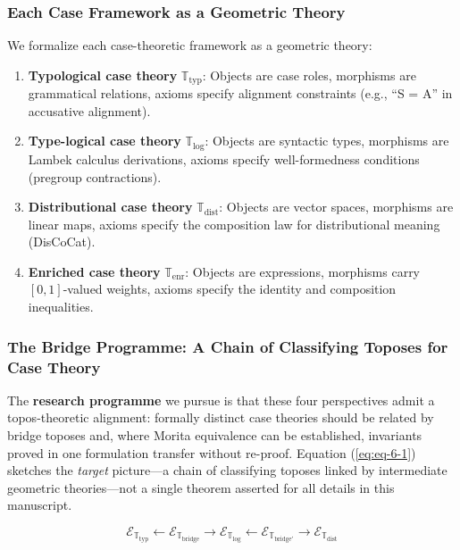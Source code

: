 \documentclass[
]{article}
\begin{document}
\subsubsection{Each Case Framework as a Geometric
Theory}\label{each-case-framework-as-a-geometric-theory}

We formalize each case-theoretic framework as a geometric theory:

\begin{enumerate}
\def\labelenumi{\arabic{enumi}.}
\item
  \textbf{Typological case theory} \(\mathbb{T}_{\text{typ}}\): Objects
  are case roles, morphisms are grammatical relations, axioms specify
  alignment constraints (e.g., ``S = A'' in accusative alignment).
\item
  \textbf{Type-logical case theory} \(\mathbb{T}_{\text{log}}\): Objects
  are syntactic types, morphisms are Lambek calculus derivations, axioms
  specify well-formedness conditions (pregroup contractions).
\item
  \textbf{Distributional case theory} \(\mathbb{T}_{\text{dist}}\):
  Objects are vector spaces, morphisms are linear maps, axioms specify
  the composition law for distributional meaning (DisCoCat).
\item
  \textbf{Enriched case theory} \(\mathbb{T}_{\text{enr}}\): Objects are
  expressions, morphisms carry \([0,1]\)-valued weights, axioms specify
  the identity and composition inequalities.
\end{enumerate}

\subsubsection{The Bridge Programme: A Chain of Classifying Toposes for
Case
Theory}\label{the-bridge-programme-a-chain-of-classifying-toposes-for-case-theory}

The \textbf{research programme} we pursue is that these four
perspectives admit a topos-theoretic alignment: formally distinct case
theories should be related by bridge toposes and, where Morita
equivalence can be established, invariants proved in one formulation
transfer without re-proof. Equation (\ref{eq:eq-6-1}) sketches the
\emph{target} picture---a chain of classifying toposes linked by
intermediate geometric theories---not a single theorem asserted for all
details in this manuscript.

\begin{equation}
\mathcal{E}_{\mathbb{T}_{\text{typ}}} \leftarrow \mathcal{E}_{\mathbb{T}_{\text{bridge}}} \rightarrow \mathcal{E}_{\mathbb{T}_{\text{log}}} \leftarrow \mathcal{E}_{\mathbb{T}_{\text{bridge}'}} \rightarrow \mathcal{E}_{\mathbb{T}_{\text{dist}}}
\label{eq:eq-6-1}
\end{equation}
\end{document}
